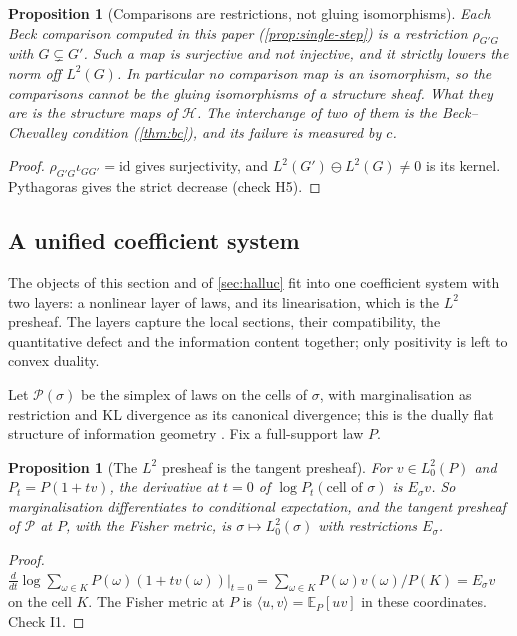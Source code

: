 \documentclass[11pt]{article}
\newtheorem{proposition}[theorem]{Proposition}
\theoremstyle{definition}
\newcommand{\id}{\mathrm{id}}
\newcommand{\EE}{\mathbb E}
\begin{document}
\begin{proposition}[Comparisons are restrictions, not gluing isomorphisms]\label{prop:not-iso}
Each Beck comparison computed in this paper (\cref{prop:single-step}) is a restriction $\rho_{G'G}$ with $G\subsetneq G'$. Such a map is
surjective and not injective, and it strictly lowers the norm off $L^2(G)$. In particular no comparison map is an isomorphism, so the
comparisons cannot be the gluing isomorphisms of a structure sheaf. What they are is the structure maps of $\mathcal H$. The
interchange of two of them is the Beck--Chevalley condition (\cref{thm:bc}), and its failure is measured by $c$.
\end{proposition}
\begin{proof}
$\rho_{G'G}\iota_{GG'}=\id$ gives surjectivity, and $L^2(G')\ominus L^2(G)\ne0$ is its kernel. Pythagoras gives the strict decrease (check
H5).
\end{proof}

\subsection{A unified coefficient system}\label{sec:unified}
The objects of this section and of \cref{sec:halluc} fit into one coefficient system with two layers: a nonlinear layer of laws, and its
linearisation, which is the $L^2$ presheaf. The layers capture the local sections, their compatibility, the quantitative defect and the
information content together; only positivity is left to convex duality.

Let $\mathcal P(\sigma)$ be the simplex of laws on the cells of $\sigma$, with marginalisation as restriction and KL divergence as its
canonical divergence; this is the dually flat structure of information geometry \cite{AmariNagaoka2000}. Fix a full-support law $P$.

\begin{proposition}[The $L^2$ presheaf is the tangent presheaf]\label{prop:tangent}
For $v\in L^2_0(P)$ and $P_t=P(1+tv)$, the derivative at $t=0$ of $\log P_t(\text{cell of }\sigma)$ is $E_\sigma v$. So
marginalisation differentiates to conditional expectation, and the tangent presheaf of $\mathcal P$ at $P$, with the Fisher metric, is
$\sigma\mapsto L^2_0(\sigma)$ with restrictions $E_\sigma$.
\end{proposition}
\begin{proof}
$\tfrac{d}{dt}\log\sum_{\omega\in K}P(\omega)(1+tv(\omega))\big|_{t=0}=\sum_{\omega\in K}P(\omega)v(\omega)/P(K)=E_\sigma v$ on the cell $K$.
The Fisher metric at $P$ is $\langle u,v\rangle=\EE_P[uv]$ in these coordinates. Check I1.
\end{proof}
\end{document}
